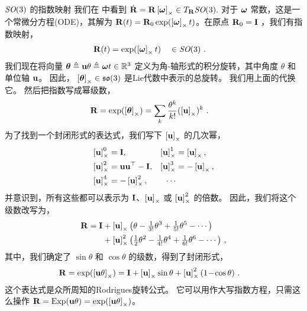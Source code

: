 
\begin{fexample}{$\textit{SO}(3)$ 的指数映射}
\label{ex:SO3_exp}
%
%
我们在  中看到 
$
\dot{{\bf R}} = {\bf R}\left[{\bm \omega}\right]_\times  \in T_{{\bf R}}{\textit{SO}(3)}.
$
%
对于 ${{\bm \omega}}$ 常数，这是一个常微分方程(ODE)，其解为 ${\bf R}(t) = {\bf R}_0\exp(\left[{\bm \omega}\right]_\times t)$。在原点 ${\bf R}_0={\bf I}$ ，我们有指数映射，
%
\begin{align*}
{\bf R}(t) &= \exp(\left[{\bm \omega}\right]_\times t) && \in\textit{SO}(3)
~. 
\end{align*}
%
我们现在将向量 ${{\bm \theta}}\triangleq{\bf u}\theta \triangleq {\bm \omega} t\in{\mathbb R}^3$ 定义为角-轴形式的积分旋转，其中角度 $\theta$ 和单位轴 ${\bf u}$。 
因此， $\left[{{\bm \theta}}\right]_\times\in{\mathfrak {so}}(3)$ 是Lie代数中表示的总旋转。
我们用上面的代换它。 
然后把指数写成幂级数，
%
\begin{align*}
{\bf R} &= \exp(\left[{{\bm \theta}}\right]_\times)= \sum_k\frac{\theta^k}{k!}{(\left[{\bf u}\right]_\times)^k} 
~.
\end{align*}
%
为了找到一个封闭形式的表达式，我们写下 $\left[{\bf u}\right]_\times$ 的几次幂，
%
\begin{align*}
\left[{\bf u}\right]_\times^0&= {\bf I},
&
\left[{\bf u}\right]_\times^1&= \left[{\bf u}\right]_\times,
\\
\left[{\bf u}\right]_\times^2&= {\bf u}{\bf u}^{\top} -{\bf I},
&
\left[{\bf u}\right]_\times^3&=-\left[{\bf u}\right]_\times,
\\
\left[{\bf u}\right]_\times^4&=-\left[{\bf u}\right]_\times^2,
&
\cdots
\end{align*}
%
并意识到，所有这些都可以表示为 ${\bf I}$、$\left[{\bf u}\right]_\times$ 或 $\left[{\bf u}\right]_\times^2$ 的倍数。
因此，我们将这个级数改写为，
%
\begin{align*}
{\bf R} = {\bf I} &+ \left[{\bf u}\right]_\times\big(\theta - \tfrac1{3!}\theta^3 + \tfrac1{5!}\theta^5 - \cdots\big) \\
  &+ \left[{\bf u}\right]_\times^2\big(\tfrac12\theta^2-\tfrac1{4!}\theta^4+\tfrac1{6!}\theta^6-\cdots\big)
  ~,
\end{align*}
%
其中，我们确定了 $\sin\theta$ 和 $\cos\theta$ 的级数，得到了封闭形式，
%
\begin{align*}
{\bf R}=\exp(\left[{\bf u}\theta\right]_\times) &= 
{\bf I} + \left[{\bf u}\right]_\times\sin\theta + \left[{\bf u}\right]_\times^2(1\!-\!\cos\theta)
~.
\end{align*}
%
这个表达式是众所周知的Rodrigues旋转公式。
它可以用作大写指数方程，只需这么操作 ${\bf R}=\operatorname*{Exp}({\bf u}\theta)=\exp(\left[{\bf u}\theta\right]_\times)$。
\end{fexample}
